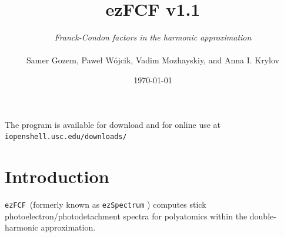 \documentclass[11pt]{article}
\begin{document}
\newcommand{\ezS}{\texttt{ezSpectrum} }
\newcommand{\ezFCF}{\texttt{ezFCF}}
\newcommand{\ezSnospace}{\texttt{ezSpectrum}}
\newcommand{\ai}{\textit{ab initio} }
\newcommand{\xml}{\texttt{.xml} }

\newcommand{\ul}[2]{\texttt{#1{\underline{~}#2}} } %

\newcommand{\ket}[1]{|#1\rangle}      %
\newcommand{\bra}[1]{\langle #1|}     %
\newcommand{\braket}[2]{\langle #1|#2\rangle}      %



\title{ezFCF v1.1}
\author{{\em Franck-Condon factors in the harmonic approximation}\\ 
  \vspace{20mm}\\
Samer Gozem, Pawe\l{} W{\'o}jcik, Vadim Mozhayskiy, and Anna I. Krylov\\ \vspace{20mm}}
\date{\today}
\maketitle

\thispagestyle{empty}

\begin{center}
\vspace{30mm}
\normalsize{The program is available for download and for online use at\\ 
\texttt{iopenshell.usc.edu/downloads/} }
\end{center}

\clearpage
\thispagestyle{empty}

\tableofcontents


\clearpage

  
\section*{Introduction}

\ezFCF\ (formerly known as \ezS) computes stick photoelectron/photodetachment spectra for polyatomics 
within the double-harmonic approximation. 
\end{document}
